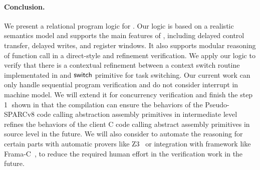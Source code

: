 \paragraph{\textbf{Conclusion.}}
We present a relational program logic for \sparc.
Our logic is based on a realistic semantics
model and supports the main features of \sparc,
including delayed control transfer, delayed writes,
and register windows.
It also supports modular reasoning of
function call in a direct-style and
refinement verification.
We apply our logic to verify
that there is a contextual refinement between
a context switch routine implementated
in \sparc{} and $\mathsf{switch}$ primitive for task switching.
Our current work can only handle
sequential \sparc{} program verification and
do not consider interrupt in machine model.
We will extend it for concurrency verification
and finish the step {\color{blue} \textcircled{1}} shown in
\Fig{\ref{fig:idea to establish contextual refinement}}
that the compilation can ensure the behaviors
of the Pseudo-SPARCv8 code calling abstraction assembly
primitives in intermediate level refines
the behaviors of
the client C code calling abstract assembly primitives
in source level in the future.
{\color{blue}
We will also consider to automate the reasoning
for certain parts with automatic provers like Z3~\cite{Z3}
or integration with framework like Frama-C~\cite{framac}, to
reduce the required human effort in the verification work
in the future.
} 